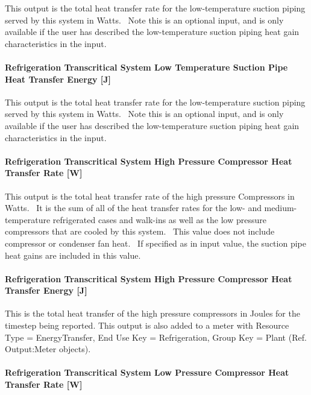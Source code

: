 This output is the total heat transfer rate for the low-temperature suction piping served by this system in Watts.~ Note this is an optional input, and is only available if the user has described the low-temperature suction piping heat gain characteristics in the input.

\paragraph{Refrigeration Transcritical System Low Temperature Suction Pipe Heat Transfer Energy {[}J{]}}\label{refrigeration-transcritical-system-low-temperature-suction-pipe-heat-transfer-energy-j}

This output is the total heat transfer rate for the low-temperature suction piping served by this system in Watts.~ Note this is an optional input, and is only available if the user has described the low-temperature suction piping heat gain characteristics in the input.

\paragraph{Refrigeration Transcritical System High Pressure Compressor Heat Transfer Rate {[}W{]}}\label{refrigeration-transcritical-system-high-pressure-compressor-heat-transfer-rate-w}

This output is the total heat transfer rate of the high pressure Compressors in Watts.~ It is the sum of all of the heat transfer rates for the low- and medium-temperature refrigerated cases and walk-ins as well as the low pressure compressors that are cooled by this system.~ This value does not include compressor or condenser fan heat.~ If specified as in input value, the suction pipe heat gains are included in this value.

\paragraph{Refrigeration Transcritical System High Pressure Compressor Heat Transfer Energy {[}J{]}}\label{refrigeration-transcritical-system-high-pressure-compressor-heat-transfer-energy-j}

This is the total heat transfer of the high pressure compressors in Joules for the timestep being reported. This output is also added to a meter with Resource Type = EnergyTransfer, End Use Key = Refrigeration, Group Key = Plant (Ref. Output:Meter objects).

\paragraph{Refrigeration Transcritical System Low Pressure Compressor Heat Transfer Rate {[}W{]}}\label{refrigeration-transcritical-system-low-pressure-compressor-heat-transfer-rate-w}

